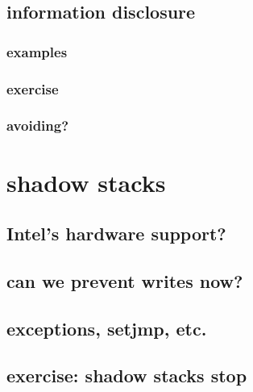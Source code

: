 

\subsection{information disclosure}
\subsubsection{examples}


\subsubsection{exercise}


\subsubsection{avoiding?}


\section{shadow stacks}


\subsection{Intel's hardware support?}


\subsection{can we prevent writes now?}


\subsection{exceptions, setjmp, etc.}


\subsection{exercise: shadow stacks stop}


